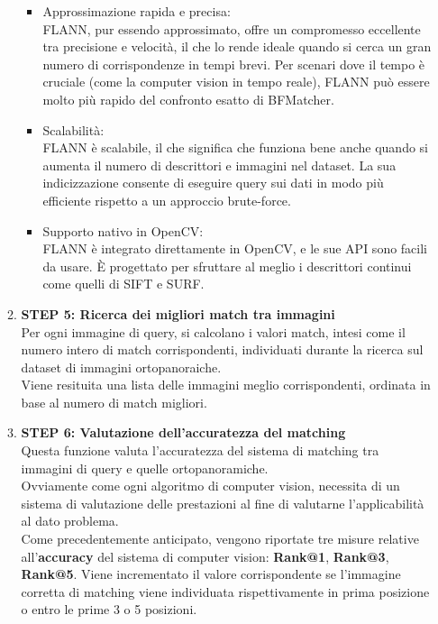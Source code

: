 \documentclass[12pt,a4paper,openright,twoside]{book}
\begin{document}
\begin{enumerate}
\begin{enumerate}
\begin{itemize}
\item Approssimazione rapida e precisa:\\
FLANN, pur essendo approssimato, offre un compromesso eccellente tra precisione e velocità, il che lo rende ideale quando si cerca un gran numero di corrispondenze in tempi brevi. Per scenari dove il tempo è cruciale (come la computer vision in tempo reale), FLANN può essere molto più rapido del confronto esatto di BFMatcher.
\item Scalabilità:\\
FLANN è scalabile, il che significa che funziona bene anche quando si aumenta il numero di descrittori e immagini nel dataset. La sua indicizzazione consente di eseguire query sui dati in modo più efficiente rispetto a un approccio brute-force.
\item Supporto nativo in OpenCV: \\
FLANN è integrato direttamente in OpenCV, e le sue API sono facili da usare. È progettato per sfruttare al meglio i descrittori continui come quelli di SIFT e SURF.
\end{itemize}

\item \textbf{STEP 5: Ricerca dei migliori match tra immagini}\\
Per ogni immagine di query, si calcolano i valori match, intesi come il numero intero di match corrispondenti, individuati durante la ricerca sul dataset di immagini ortopanoraiche.\\
Viene resituita una lista delle immagini meglio corrispondenti, ordinata in base al numero di match migliori.

\item \textbf{STEP 6: Valutazione dell'accuratezza del matching}\\
Questa funzione valuta l'accuratezza del sistema di matching tra immagini di query e quelle ortopanoramiche.\\
Ovviamente come ogni algoritmo di computer vision, necessita di un sistema di valutazione delle prestazioni al fine di valutarne l'applicabilità al dato problema.\\
Come precedentemente anticipato, vengono riportate tre misure relative all'\textbf{accuracy} del sistema di computer vision: \textbf{Rank@1},  \textbf{Rank@3},  \textbf{Rank@5}. Viene incrementato il valore corrispondente se l'immagine corretta di matching viene individuata rispettivamente in prima posizione o entro le prime 3 o 5 posizioni.


\end{enumerate}
\end{enumerate}
\end{document}
